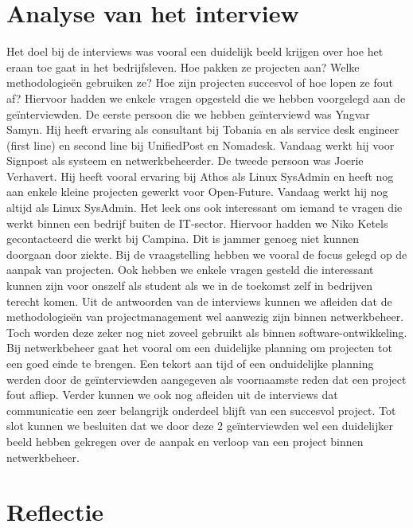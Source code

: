 \documentclass{hogent-article}
\begin{document}
    \section{Analyse van het interview}
    
    Het doel bij de interviews was vooral een duidelijk beeld krijgen over hoe het eraan toe gaat in het bedrijfsleven. Hoe pakken ze projecten aan? Welke methodologieën gebruiken ze? Hoe zijn projecten succesvol of hoe lopen ze fout af? Hiervoor hadden we enkele vragen opgesteld die we hebben voorgelegd aan de geïnterviewden. De eerste persoon die we hebben geïnterviewd was Yngvar Samyn. Hij heeft ervaring als consultant bij Tobania en als service desk engineer (first line) en second line bij UnifiedPost en Nomadesk. Vandaag werkt hij voor Signpost als systeem en netwerkbeheerder. De tweede persoon was Joerie Verhavert. Hij heeft vooral ervaring bij Athos als Linux SysAdmin en heeft nog aan enkele kleine projecten gewerkt voor Open-Future. Vandaag werkt hij nog altijd als Linux SysAdmin. Het leek ons ook interessant om iemand te vragen die werkt binnen een bedrijf buiten de IT-sector. Hiervoor hadden we Niko Ketels gecontacteerd die werkt bij Campina. Dit is jammer genoeg niet kunnen doorgaan door ziekte. Bij de vraagstelling hebben we vooral de focus gelegd op de aanpak van projecten. Ook hebben we enkele vragen gesteld die interessant kunnen zijn voor onszelf als student als we in de toekomst zelf in bedrijven terecht komen. Uit de antwoorden van de interviews kunnen we afleiden dat de methodologieën van projectmanagement wel aanwezig zijn binnen netwerkbeheer. Toch worden deze zeker nog niet zoveel gebruikt als binnen software-ontwikkeling. Bij netwerkbeheer gaat het vooral om een duidelijke planning om projecten tot een goed einde te brengen. Een tekort aan tijd of een onduidelijke planning werden door de geïnterviewden aangegeven als voornaamste reden dat een project fout afliep. Verder kunnen we ook nog afleiden uit de interviews dat communicatie een zeer belangrijk onderdeel blijft van een succesvol project. Tot slot kunnen we besluiten dat we door deze 2 geïnterviewden wel een duidelijker beeld hebben gekregen over de aanpak en verloop van een project binnen netwerkbeheer.
    
    
    \section{Reflectie}
    
\end{document}
